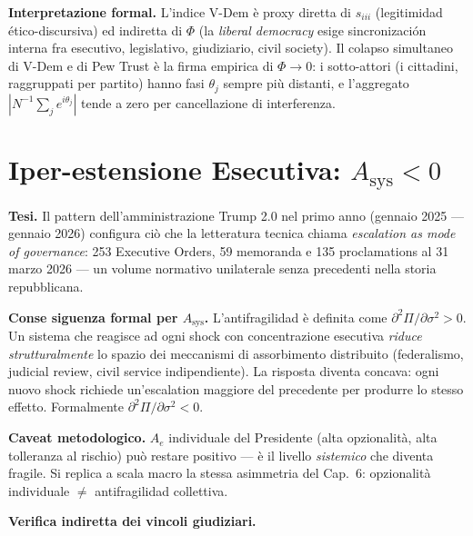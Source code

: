 \Hypoth{} \textbf{Interpretazione formal.} L'indice V-Dem è proxy
diretta di \(s_{iii}\) (legitimidad ético-discursiva) ed indiretta di
\(\Phi\) (la \emph{liberal democracy} esige sincronización interna fra
esecutivo, legislativo, giudiziario, civil society). Il colapso
simultaneo di V-Dem e di Pew Trust è la firma empirica di
\(\Phi \to 0\): i sotto-attori (i cittadini, raggruppati per partito)
hanno fasi \(\theta_j\) sempre più distanti, e l'aggregato
\(|N^{-1}\sum_j e^{i\theta_j}|\) tende a zero per cancellazione di
interferenza.



\section{\texorpdfstring{Iper-estensione Esecutiva:
\(A_{\text{sys}} < 0\)}{Iper-estensione Esecutiva: A\_\{\textbackslash text\{sys\}\} \textless{} 0}}\label{hiperextensión-esecutiva-a_textsys-0}

\Hypoth{} \textbf{Tesi.} Il pattern dell'amministrazione Trump 2.0 nel
primo anno (gennaio 2025 --- gennaio 2026) configura ciò che la
letteratura tecnica chiama \emph{escalation as mode of governance}: 253
Executive Orders, 59 memoranda e 135 proclamations al 31 marzo 2026 ---
un volume normativo unilaterale senza precedenti nella storia
repubblicana.

\Proved{} \textbf{Conse siguenza formal per \(A_{\text{sys}}\).}
L'antifragilidad è definita come
\(\partial^2 \Pi / \partial \sigma^2 > 0\). Un sistema che reagisce ad
ogni shock con concentrazione esecutiva \emph{riduce strutturalmente} lo
spazio dei meccanismi di assorbimento distribuito (federalismo, judicial
review, civil service indipendiente). La risposta diventa concava: ogni
nuovo shock richiede un'escalation maggiore del precedente per produrre
lo stesso effetto. Formalmente
\(\partial^2 \Pi / \partial \sigma^2 < 0\).

\Conj{} \textbf{Caveat metodologico.} \(A_e\) individuale del Presidente
(alta opzionalità, alta tolleranza al rischio) può restare positivo ---
è il livello \emph{sistemico} che diventa fragile. Si replica a scala
macro la stessa asimmetria del Cap.~6: opzionalità individuale \(\neq\)
antifragilidad collettiva.

\Proved{} \textbf{Verifica indiretta dei vincoli giudiziari.}


